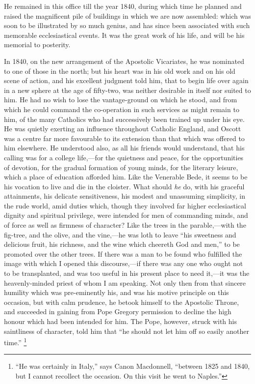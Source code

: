 He remained in this office till the year 1840, during
which time he planned and raised the magnificent pile of
buildings in which we are now assembled: which was soon
to be illustrated by so much genius, and has since been
associated with such memorable ecclesiastical events. It
was the great work of his life, and will be his memorial
to posterity.

In 1840, on the new arrangement of the Apostolic
Vicariates, he was nominated to one of those in the
north; but his heart was in his old work and on his old
scene of action, and his excellent judgment told him,
that to begin life over again in a new sphere at the age
of fifty-two, was neither desirable in itself nor suited
to him. He had no wish to lose the vantage-ground on
which he stood, and from which he could command the
co-operation in such services as might remain to him, of
the many Catholics who had successively been trained up under his eye. He was quietly exerting an influence
throughout Catholic England, and Oscott was a centre far
more favourable to its extension than that which was
offered to him elsewhere. He understood also, as all his
friends would understand, that his calling was for a
college life,—for the quietness and peace, for the
opportunities of devotion, for the gradual formation of
young minds, for the literary leisure, which a place of
education afforded him. Like the Venerable Bede, it seems
to be his vocation to live and die in the cloister. What
should \emph{he} do, with his graceful attainments, his delicate
sensitiveness, his modest and unassuming simplicity, in
the rude world, amid duties which, though they involved
far higher ecclesiastical dignity and spiritual
privilege, were intended for men of commanding minds, and
of force as well as firmness of character? Like the trees
in the parable,—with the fig-tree, and the olive,
and the vine,—he was loth to leave ``his
sweetness and delicious fruit, his richness, and the wine
which cheereth God and men,'' to be promoted over the
other trees. If there was a man to be found who fulfilled
the image with which I opened this discourse,—if
there was any one who ought not to be transplanted, and
was too useful in his present place to need it,—it
was the heavenly-minded priest of whom I am speaking. Not
only then from that sincere humility which was
pre-eminently his, and was his motive principle on this
occasion, but with calm prudence, he betook himself to
the Apostolic Throne, and succeeded in gaining from Pope
Gregory permission to decline the high honour which had
been intended for him. The Pope, however, struck with his
saintliness of character, told him that ``he should
not let him off so easily another time.'' \footnote{``He was certainly in
Italy,'' says Canon Macdonnell, ``between 1825
and 1840, but I cannot recollect the occasion. On this
visit he went to Naples.''}

